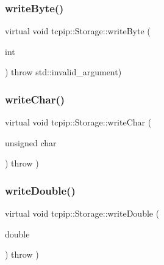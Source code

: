 \subsubsection{\texorpdfstring{write\+Byte()}{writeByte()}}
{\footnotesize\ttfamily virtual void tcpip\+::\+Storage\+::write\+Byte (\begin{DoxyParamCaption}\item[{int}]{ }\end{DoxyParamCaption}) throw  std\+::invalid\+\_\+argument) \hspace{0.3cm}{\ttfamily [virtual]}}

\mbox{\label{classtcpip_1_1_storage_a563b9a0d45d32ce3f331d29dc949a8e7}} 
\subsubsection{\texorpdfstring{write\+Char()}{writeChar()}}
{\footnotesize\ttfamily virtual void tcpip\+::\+Storage\+::write\+Char (\begin{DoxyParamCaption}\item[{unsigned}]{char }\end{DoxyParamCaption}) throw  ) \hspace{0.3cm}{\ttfamily [virtual]}}

\mbox{\label{classtcpip_1_1_storage_afb0fc2b3b7f32ac7cba3d885965e417e}} 
\subsubsection{\texorpdfstring{write\+Double()}{writeDouble()}}
{\footnotesize\ttfamily virtual void tcpip\+::\+Storage\+::write\+Double (\begin{DoxyParamCaption}\item[{double}]{ }\end{DoxyParamCaption}) throw  ) \hspace{0.3cm}{\ttfamily [virtual]}}

